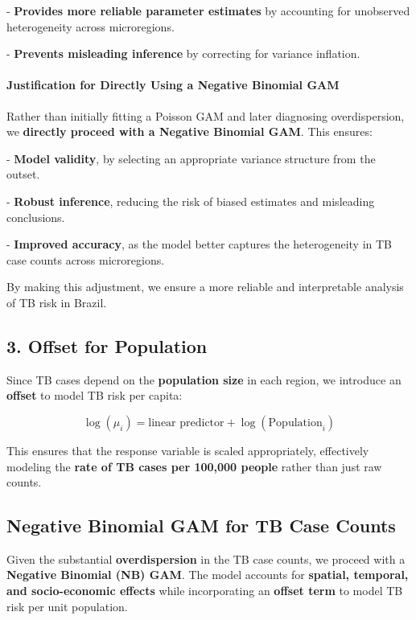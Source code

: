 \documentclass[
  11pt,
  a4paper,11pt]{article}
\begin{document}
- \textbf{Provides more reliable parameter estimates} by accounting for
unobserved heterogeneity across microregions.

- \textbf{Prevents misleading inference} by correcting for variance
inflation.

\paragraph{\texorpdfstring{\textbf{Justification for Directly Using a
Negative Binomial
GAM}}{Justification for Directly Using a Negative Binomial GAM}}\label{justification-for-directly-using-a-negative-binomial-gam}

Rather than initially fitting a Poisson GAM and later diagnosing
overdispersion, we \textbf{directly proceed with a Negative Binomial
GAM}. This ensures:

- \textbf{Model validity}, by selecting an appropriate variance
structure from the outset.

- \textbf{Robust inference}, reducing the risk of biased estimates and
misleading conclusions.

- \textbf{Improved accuracy}, as the model better captures the
heterogeneity in TB case counts across microregions.

By making this adjustment, we ensure a more reliable and interpretable
analysis of TB risk in Brazil.

\subsection{3. Offset for Population}\label{offset-for-population}

Since TB cases depend on the \textbf{population size} in each region, we
introduce an \textbf{offset} to model TB risk per capita:

\[
\log(\mu_i) = \text{linear predictor} + \log(\text{Population}_i)
\]

This ensures that the response variable is scaled appropriately,
effectively modeling the \textbf{rate of TB cases per 100,000 people}
rather than just raw counts.

\subsection{\texorpdfstring{\textbf{Negative Binomial GAM for TB Case
Counts}}{Negative Binomial GAM for TB Case Counts}}\label{negative-binomial-gam-for-tb-case-counts}

Given the substantial \textbf{overdispersion} in the TB case counts, we
proceed with a \textbf{Negative Binomial (NB) GAM}. The model accounts
for \textbf{spatial, temporal, and socio-economic effects} while
incorporating an \textbf{offset term} to model TB risk per unit
population.
\end{document}
